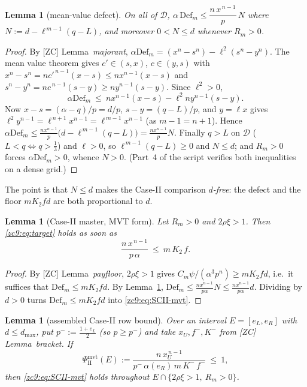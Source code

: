 \documentclass[11pt]{amsart}
\newtheorem{lemma}[theorem]{Lemma}
\newcommand{\D}{\mathcal D}
\newcommand{\Def}{\mathrm{Def}}
\begin{document}
\begin{lemma}[mean-value defect]\label{zc9:lem:mvt}
On all of $\D$, $\alpha\,\Def_m\le\dfrac{n\,x^{\,n-1}}p\,N$ where
$N:=d-\ell^{\,m-1}(q-L)$, and moreover $0<N\le d$ whenever $R_m>0$.
\end{lemma}

\begin{proof}
By [ZC] Lemma~\emph{majorant}, $\alpha\Def_m=(x^n-s^n)-\ell^2(s^n-y^n)$.  The
mean value theorem gives $c'\in(s,x)$, $c\in(y,s)$ with $x^n-s^n=n c'^{\,n-1}
(x-s)\le n x^{n-1}(x-s)$ and $s^n-y^n=n c^{\,n-1}(s-y)\ge n y^{n-1}(s-y)$.
Since $\ell^2>0$,
\[
 \alpha\Def_m\ \le\ n x^{n-1}(x-s)-\ell^2 n y^{n-1}(s-y).
\]
Now $x-s=(\alpha-q)/p=d/p$, $s-y=(q-L)/p$, and $y=\ell x$ gives
$\ell^2 y^{n-1}=\ell^{\,n+1}x^{n-1}=\ell^{\,m-1}x^{n-1}$ (as $m-1=n+1$).  Hence
$\alpha\Def_m\le\tfrac{n x^{n-1}}p\bigl(d-\ell^{\,m-1}(q-L)\bigr)
=\tfrac{n x^{n-1}}p N$.  Finally $q>L$ on $\D$ ($L<q\iff q>\tfrac13$) and
$\ell>0$, so $\ell^{\,m-1}(q-L)\ge0$ and $N\le d$; and $R_m>0$ forces
$\alpha\Def_m>0$, whence $N>0$.  (Part~4 of the script verifies both
inequalities on a dense grid.)
\end{proof}

The point is that $N\le d$ makes the Case-II comparison \emph{$d$-free}: the
defect and the floor $mK_2fd$ are both proportional to $d$.

\begin{lemma}[Case-II master, MVT form]\label{zc9:lem:mvtII}
Let $R_m>0$ and $2\rho\xi>1$.  Then \eqref{zc9:eq:target} holds as soon as
\begin{equation}\label{zc9:eq:SCII-mvt}
 \frac{n\,x^{\,n-1}}{p\,\alpha}\ \le\ m\,K_2\,f .
\end{equation}
\end{lemma}

\begin{proof}
By [ZC] Lemma~\emph{payfloor}, $2\rho\xi>1$ gives
$C_m\psi/(\alpha^3p^{n})\ge mK_2fd$, i.e.\ it suffices that $\Def_m\le mK_2fd$.
By Lemma~\ref{zc9:lem:mvt}, $\Def_m\le\tfrac{n x^{n-1}}{p\alpha}N\le
\tfrac{n x^{n-1}}{p\alpha}d$.  Dividing by $d>0$ turns $\Def_m\le mK_2fd$ into
\eqref{zc9:eq:SCII-mvt}.
\end{proof}

\begin{lemma}[assembled Case-II row bound]\label{zc9:lem:mvtrow}
Over an interval $E=[e_L,e_R]$ with $d\le d_{\max}$, put
$p^-:=\tfrac{1+e_L}2$ (so $p\ge p^-$) and take $x_U,f^-,K^-$ from [ZC]
Lemma~\emph{bracket}.  If
\[
 \Psi_{\mathrm{II}}^{\mathrm{mvt}}(E):=
 \frac{n\,x_U^{\,n-1}}{p^-\,\alpha(e_R)\,m\,K^-\,f^-}\ \le\ 1,
\]
then \eqref{zc9:eq:SCII-mvt} holds throughout $E\cap\{2\rho\xi>1,\ R_m>0\}$.
\end{lemma}
\end{document}
